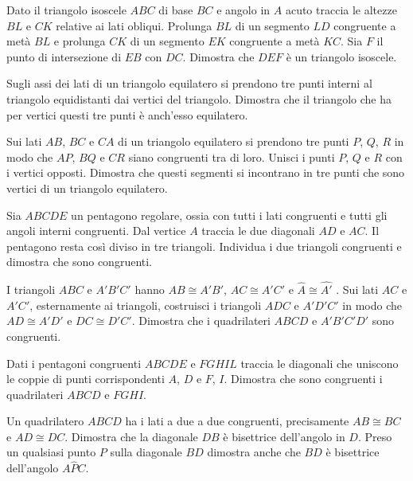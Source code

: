 \begin{multicols}{2}
\begin{esercizio}
\label{ese:2.92}
Dato il triangolo isoscele $ABC$ di base $BC$ e angolo in $A$ acuto traccia le altezze $BL$ e $CK$ relative ai lati obliqui. Prolunga $BL$ di un segmento $LD$ congruente a metà $BL$ e prolunga $CK$ di un segmento $EK$ congruente a metà $KC$. Sia $F$ il punto di intersezione di $EB$ con $DC$. Dimostra che $DEF$ è un triangolo isoscele.
\end{esercizio}

\begin{esercizio}
\label{ese:2.93}
Sugli assi dei lati di un triangolo equilatero si prendono tre punti interni al triangolo equidistanti dai vertici del triangolo. Dimostra che il triangolo che ha per vertici questi tre punti è anch'esso equilatero.
\end{esercizio}

\begin{esercizio}
\label{ese:2.94}
Sui lati $AB$, $BC$ e $CA$ di un triangolo equilatero si prendono tre punti $P$, $Q$, $R$ in modo che $AP$, $BQ$ e $CR$ siano congruenti tra di loro. Unisci i punti $P$, $Q$ e $R$ con i vertici opposti. Dimostra che questi segmenti si incontrano in tre punti che sono vertici di un triangolo equilatero.
\end{esercizio}

\begin{esercizio}
\label{ese:2.95}
Sia $ABCDE$ un pentagono regolare, ossia con tutti i lati congruenti e tutti gli angoli interni congruenti. Dal vertice $A$ traccia le due diagonali $AD$ e $AC$. Il pentagono resta così diviso in tre triangoli. Individua i due triangoli congruenti e dimostra che sono congruenti.
\end{esercizio}

\begin{esercizio}
\label{ese:2.96}
I triangoli $ABC$ e $A'B'C'$ hanno $AB\cong A'B'$, $AC\cong A'C'$ e $\widehat{A}\cong\widehat{A'}$ . Sui lati $AC$ e $A'C'$, esternamente ai triangoli, costruisci i triangoli $ADC$ e $A'D'C'$ in modo che $AD\cong A'D'$ e $DC\cong D'C'$. Dimostra che i quadrilateri $ABCD$ e $A'B'C'D'$ sono congruenti.
\end{esercizio}

\begin{esercizio}
\label{ese:2.97}
Dati i pentagoni congruenti $ABCDE$ e $FGHIL$ traccia le diagonali che uniscono le coppie di punti corrispondenti $A$, $D$ e $F$, $I$. Dimostra che sono congruenti i quadrilateri $ABCD$ e $FGHI$.
\end{esercizio}

\begin{esercizio}
\label{ese:2.98}
Un quadrilatero $ABCD$ ha i lati a due a due congruenti, precisamente $AB\cong BC$ e $AD\cong DC$. Dimostra che la diagonale $DB$ è bisettrice dell'angolo in $D$. Preso un qualsiasi punto $P$ sulla diagonale $BD$ dimostra anche che $BD$ è bisettrice dell'angolo $A\widehat{P}C$.
\end{esercizio}

\end{multicols}

